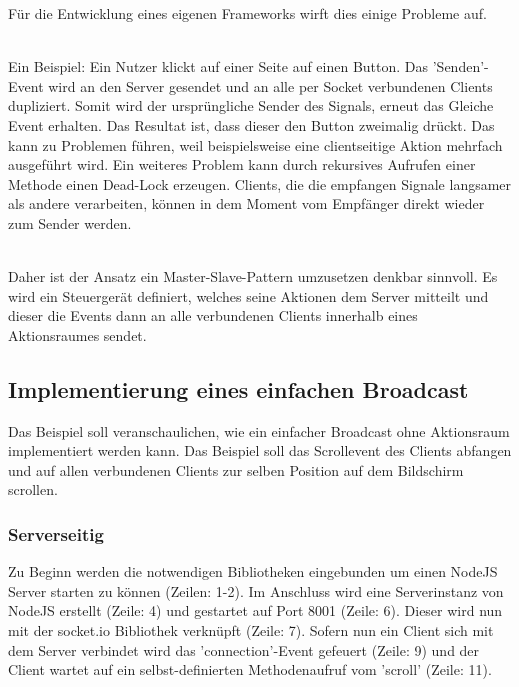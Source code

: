 Für die Entwicklung eines eigenen \Gls{Framework}s wirft dies einige Probleme auf.

\\ Ein  Beispiel: Ein Nutzer klickt auf einer Seite auf einen Button. Das 'Senden'-Event wird an den Server gesendet und an alle per Socket verbundenen Clients dupliziert. Somit wird der ursprüngliche Sender des Signals, erneut das Gleiche \Gls{Event} erhalten. Das Resultat ist, dass dieser den Button zweimalig drückt. Das kann zu Problemen führen, weil beispielsweise eine clientseitige Aktion mehrfach ausgeführt wird. Ein weiteres Problem kann durch rekursives Aufrufen einer Methode einen Dead-Lock erzeugen. Clients, die die empfangen Signale langsamer als andere verarbeiten, können in dem Moment vom Empfänger direkt wieder zum Sender werden.
	
	\\Daher ist der Ansatz ein Master-Slave-Pattern umzusetzen denkbar sinnvoll. Es wird ein Steuergerät definiert, welches seine Aktionen dem Server mitteilt und dieser die \Gls{Event}s dann an alle verbundenen Clients innerhalb eines Aktionsraumes sendet.
	
	
	\subsection{Implementierung eines einfachen Broadcast}
	Das Beispiel soll veranschaulichen, wie ein einfacher Broadcast ohne Aktionsraum implementiert werden kann. Das Beispiel soll das Scrollevent des Clients abfangen und auf allen verbundenen Clients zur selben Position auf dem Bildschirm scrollen.
	
	\subsubsection{Serverseitig}
	Zu Beginn werden die notwendigen Bibliotheken eingebunden um einen \gls{NodeJS} Server starten zu können (Zeilen: 1-2). Im Anschluss wird  eine Serverinstanz von \gls{NodeJS} erstellt (Zeile: 4) und gestartet auf Port 8001 (Zeile: 6). Dieser wird nun mit der socket.io Bibliothek verknüpft (Zeile: 7). Sofern nun ein Client sich mit dem Server verbindet wird das 'connection'-Event gefeuert (Zeile: 9) und der Client wartet auf ein selbst-definierten Methodenaufruf vom 'scroll' (Zeile: 11).
	
